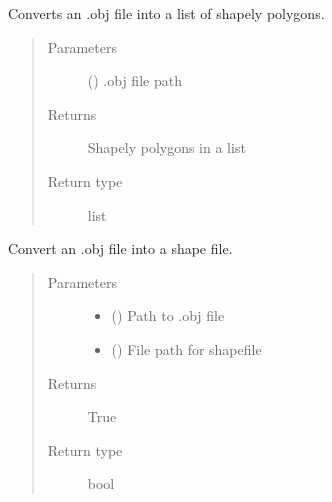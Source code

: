 \documentclass[letterpaper,10pt,english]{sphinxmanual}
\begin{document}
\begin{fulllineitems}
\label{\detokenize{geometry:livestock.geometry.obj_to_polygons}}
Converts an .obj file into a list of shapely polygons.
\begin{quote}\begin{description}
\item[{Parameters}] \leavevmode
{} () \textendash{} .obj file path

\item[{Returns}] \leavevmode
Shapely polygons in a list

\item[{Return type}] \leavevmode
list

\end{description}\end{quote}

\end{fulllineitems}


\begin{fulllineitems}
\label{\detokenize{geometry:livestock.geometry.obj_to_shp}}
Convert an .obj file into a shape file.
\begin{quote}\begin{description}
\item[{Parameters}] \leavevmode\begin{itemize}
\item {} 
 () \textendash{} Path to .obj file

\item {} 
 () \textendash{} File path for shapefile

\end{itemize}

\item[{Returns}] \leavevmode
True

\item[{Return type}] \leavevmode
bool

\end{description}\end{quote}

\end{fulllineitems}
\end{document}
